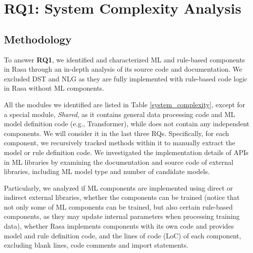 
\section{RQ1: System Complexity Analysis}
\vspace{-3pt}

\subsection{Methodology}

To answer \textbf{RQ1}, we identified and characterized ML and rule-based components in Rasa through an in-depth analysis of its source code and documentation. We excluded DST and NLG as they are fully implemented with rule-based code logic in Rasa without ML components. 

All the modules we identified are listed in Table \ref{system_complexity}, except for a special module, \textit{Shared}, as it contains general data processing code and  ML model definition code (e.g., Transformer), while does not contain any independent components. We will consider it in the last three RQs. Specifically, for each component, we recursively tracked methods within it to manually extract the model or rule definition code. We investigated the implementation details of APIs in ML libraries by examining the documentation and source code of external libraries, including ML model type and number of candidate models. 

Particularly, we analyzed if ML components are implemented using direct or indirect external libraries, whether the components can be trained (notice that not only some of ML components can be trained, but also certain rule-based components, as they may update internal parameters when processing training data),  whether Rasa implements components with its own code and provides model and rule definition code, and the lines of code (LoC) of each component, excluding blank lines, code comments and import statements. 




